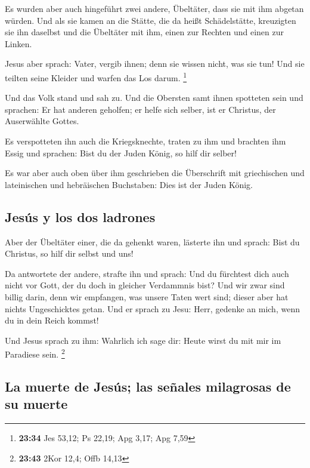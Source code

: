  Es wurden aber auch hingeführt zwei andere, Übeltäter,
dass sie mit ihm abgetan würden.  Und als sie kamen an
die Stätte, die da heißt Schädelstätte, kreuzigten sie ihn daselbst und
die Übeltäter mit ihm, einen zur Rechten und einen zur Linken.

 Jesus aber sprach: Vater, vergib ihnen; denn sie wissen
nicht, was sie tun! Und sie teilten seine Kleider und warfen das Los
darum. \footnote{\textbf{23:34} Jes 53,12; Ps 22,19; Apg 3,17; Apg 7,59}

 Und das Volk stand und sah zu. Und die Obersten samt
ihnen spotteten sein und sprachen: Er hat anderen geholfen; er helfe
sich selber, ist er Christus, der Auserwählte Gottes.

 Es verspotteten ihn auch die Kriegsknechte, traten zu
ihm und brachten ihm Essig  und sprachen: Bist du der
Juden König, so hilf dir selber!

 Es war aber auch oben über ihm geschrieben die
Überschrift mit griechischen und lateinischen und hebräischen
Buchstaben: Dies ist der Juden König.

\hypertarget{jesuxfas-y-los-dos-ladrones}{%
\subsection{Jesús y los dos
ladrones}\label{jesuxfas-y-los-dos-ladrones}}

 Aber der Übeltäter einer, die da gehenkt waren, lästerte
ihn und sprach: Bist du Christus, so hilf dir selbst und uns!

 Da antwortete der andere, strafte ihn und sprach: Und du
fürchtest dich auch nicht vor Gott, der du doch in gleicher Verdammnis
bist?  Und wir zwar sind billig darin, denn wir
empfangen, was unsere Taten wert sind; dieser aber hat nichts
Ungeschicktes getan.  Und er sprach zu Jesu: Herr,
gedenke an mich, wenn du in dein Reich kommst!

 Und Jesus sprach zu ihm: Wahrlich ich sage dir: Heute
wirst du mit mir im Paradiese sein. \footnote{\textbf{23:43} 2Kor 12,4;
  Offb 14,13}

\hypertarget{la-muerte-de-jesuxfas-las-seuxf1ales-milagrosas-de-su-muerte}{%
\subsection{La muerte de Jesús; las señales milagrosas de su
muerte}\label{la-muerte-de-jesuxfas-las-seuxf1ales-milagrosas-de-su-muerte}}

